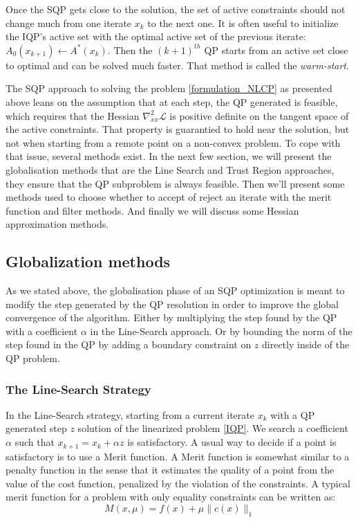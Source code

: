 Once the SQP gets close to the solution, the set of active constraints should not change much from one iterate $x_k$ to the next one.
It is often useful to initialize the IQP's active set with the optimal active set of the previous iterate: $\mathit{A}_0(x_{k+1})\leftarrow\mathit{A}^*(x_k)$. Then the ${(k+1)}^{th}$ QP starts from an active set close to optimal and can be solved much faster.
That method is called the \textit{warm-start}.

The SQP approach to solving the problem \ref{formulation_NLCP} as presented above leans on the assumption that at each step, the QP generated is feasible,
which requires that the Hessian $\nabla_{xx}^2\mathcal{L}$ is positive definite on the tangent space of the active constraints.
That property is guarantied to hold near the solution, but not when starting from a remote point on a non-convex problem.
To cope with that issue, several methods exist.
In the next few section, we will present the globalisation methods that are the Line Search and Trust Region approaches, they ensure that the QP subproblem is always feasible.
Then we'll present some methods used to choose whether to accept of reject an iterate with the merit function and filter methods.
And finally we will discuss some Hessian approximation methods.

\subsection{Globalization methods}
\label{sub:globalization_methods}

As we stated above, the globalisation phase of an SQP optimization is meant to modify the step generated by the QP resolution in order to improve the global convergence of the algorithm.
Either by multiplying the step found by the QP with a coefficient $\alpha$ in the Line-Search approach.
Or by bounding the norm of the step found in the QP by adding a boundary constraint on $z$ directly inside of the QP problem.

\subsubsection{The Line-Search Strategy}
In the Line-Search strategy, starting from a current iterate $x_k$ with a QP generated step $z$ solution of the linearized problem \ref{IQP}.
We search a coefficient $\alpha$ such that $x_{k+1}=x_k+\alpha z$ is satisfactory.
A usual way to decide if a point is satisfactory is to use a Merit function.
A Merit function is somewhat similar to a penalty function in the sense that it estimates the quality of a point from the value of the cost function, penalized by the violation of the constraints.
A typical merit function for a problem with only equality constraints can be written as:
\begin{equation}
  M(x,\mu) = f(x)+\mu \|c(x)\|_1
\end{equation}

